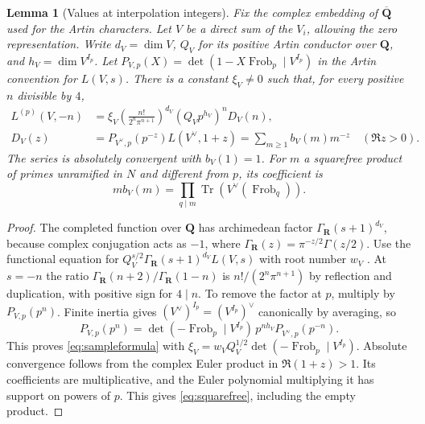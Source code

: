 \documentclass[11pt]{amsart}
\numberwithin{equation}{section}
\newtheorem{lemma}[theorem]{Lemma}
\theoremstyle{definition}
\theoremstyle{remark}
\newcommand{\Q}{\mathbf Q}
\newcommand{\R}{\mathbf R}
\newcommand{\Qbar}{\overline{\mathbf Q}}
\begin{document}
\begin{lemma}[Values at interpolation integers]\label{lem:archsamples}
Fix the complex embedding of $\Qbar$ used for the Artin characters.
Let $V$ be a direct sum of the $V_i$, allowing the zero representation. Write $d_V=\dim V$, $Q_V$ for its positive Artin
conductor over $\Q$, and $h_V=\dim V^{I_p}$. Let
$P_{V,p}(X)=\det(1-X\operatorname{Frob}_p\mid V^{I_p})$ in the
Artin convention for $L(V,s)$. There is a constant $\xi_V\ne0$
such that, for every positive $n$ divisible by $4$,
\begin{align}
 L^{(p)}(V,-n)
  &=\xi_V\left(\frac{n!}{2^n\pi^{n+1}}\right)^{d_V}
          (Q_Vp^{h_V})^n D_V(n),\label{eq:sampleformula}\\
 D_V(z)&=P_{V^\vee,p}(p^{-z}) L(V^\vee,1+z)
        =\sum_{m\ge1} b_V(m)m^{-z}\quad(\Re z>0).\nonumber
\end{align}
The series is absolutely convergent with $b_V(1)=1$. For $m$ a
squarefree product of primes unramified in $N$ and different from
$p$, its coefficient is
\begin{equation}\label{eq:squarefree}
 m b_V(m)=\prod_{q\mid m}\operatorname{Tr}
                     (V^\vee(\operatorname{Frob}_q)).
\end{equation}
\end{lemma}

\begin{proof}
The completed function over $\Q$ has archimedean factor
$\Gamma_\R(s+1)^{d_V}$, because complex conjugation acts as $-1$,
where $\Gamma_\R(z)=\pi^{-z/2}\Gamma(z/2)$. Use the functional
equation for $Q_V^{s/2}\Gamma_\R(s+1)^{d_V}L(V,s)$ with
root number $w_V$ \cite[Ch.~VII, \S12]{Neukirch}.
At $s=-n$ the ratio $\Gamma_\R(n+2)/\Gamma_\R(1-n)$ is
$n!/(2^n\pi^{n+1})$ by reflection and duplication, with positive
sign for $4\mid n$. To remove the factor at $p$, multiply by
$P_{V,p}(p^n)$. Finite inertia gives
$(V^\vee)^{I_p}=(V^{I_p})^\vee$ canonically by averaging, so
\[
 P_{V,p}(p^n)=
 \det(-\operatorname{Frob}_p\mid V^{I_p})\,p^{nh_V}
                     P_{V^\vee,p}(p^{-n}).
\]
This proves \eqref{eq:sampleformula} with
$\xi_V=w_VQ_V^{1/2}\det(-\operatorname{Frob}_p\mid V^{I_p})$.
Absolute convergence follows from the complex Euler product in
$\Re(1+z)>1$. Its coefficients are multiplicative, and the Euler
polynomial multiplying it has support on powers of $p$.
This gives \eqref{eq:squarefree}, including the empty product.
\end{proof}
\end{document}
